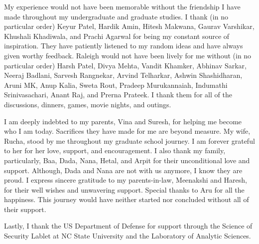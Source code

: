 \begin{acknowledgements}
My experience would not have been memorable without the friendship I have made throughout my undergraduate and graduate studies. 
I thank (in no particular order) Keyur Patel, Hardik Amin, Hitesh Makwana, Gaurav Varshikar, Khushali Khadiwala, and Prachi Agarwal for being my constant source of inspiration. 
They have patiently listened to my random ideas and have always given worthy feedback. 
Raleigh would not have been lively for me without (in no particular order) Harsh Patel, Divya Mehta, Vandit Khamker, Abhinav Sarkar, Neeraj Badlani, Sarvesh Rangnekar, Arvind Telharkar, Ashwin Shashidharan, Aruni MK, Anup Kalia, Sweta Rout, Pradeep Murukannaiah, Indumathi Srinivasachari, Anant Raj, and Prerna Prateek.
I thank them for all of the discussions, dinners, games, movie nights, and outings. 

I am deeply indebted to my parents, Vina and Suresh, for helping me become who I am today. 
Sacrifices they have made for me are beyond measure. 
My wife, Rucha, stood by me throughout my graduate school journey. 
I am forever grateful to her for her love, support, and encouragement. 
I also thank my family, particularly, Baa, Dada, Nana, Hetal, and Arpit for their unconditional love and support. 
Although, Dada and Nana are not with us anymore, I know they are proud. 
I express sincere gratitude to my parents-in-law, Meenakshi and Haresh, for their well wishes and unwavering support. 
Special thanks to Aru for all the happiness. 
This journey would have neither started nor concluded without all of their support. 

Lastly, I thank the US Department of Defense for support through the
Science of Security Lablet at NC State University and the Laboratory of Analytic Sciences.

\end{acknowledgements}

\thesistableofcontents

\thesislistoftables

\thesislistoffigures
